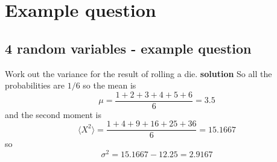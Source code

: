 
\ifind
\section*{Example question}
\else
\subsection*{4 random variables - example question}
\fi
Work out the variance for the result of rolling a die.
\noindent \textbf{solution} So all the probabilities are $1/6$ so the mean is
\begin{equation}
  \mu=\frac{1+2+3+4+5+6}{6}=3.5
\end{equation}
and the second moment is
\begin{equation}
  \langle X^2\rangle =\frac{1+4+9+16+25+36}{6}=15.1667
\end{equation}
so
\begin{equation}
  \sigma^2=15.1667-12.25=2.9167
\end{equation}

